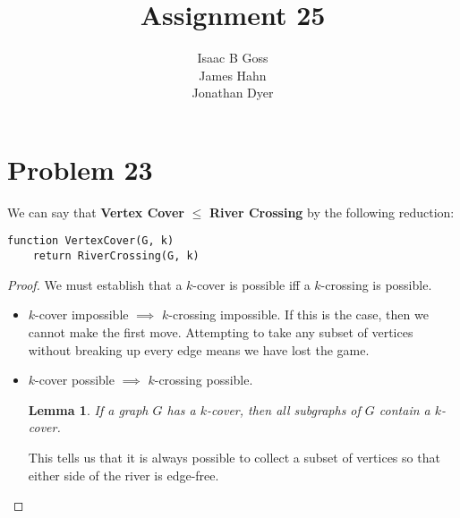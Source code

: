 \documentclass{article}
\author{Isaac B Goss\\ James Hahn\\ Jonathan Dyer}
\title{Assignment 25}
\newtheorem{lemma}{Lemma}
\providecommand{\prob}[1]{\section*{Problem #1}}
\providecommand{\reducible}[2]{
  \textbf{#1} $\leq$ \textbf{#2}
}
\begin{document}
\maketitle

    \prob{23}
    We can say that \reducible{Vertex Cover}{River Crossing} by the following reduction:
    \begin{lstlisting}
function VertexCover(G, k)
    return RiverCrossing(G, k)
    \end{lstlisting}
    \begin{proof}
        We must establish that a $k$-cover is possible iff a $k$-crossing is possible.

        \begin{itemize}
            \item $k$-cover impossible $\implies$ $k$-crossing impossible.
            If this is the case, then we cannot make the first move.
            Attempting to take any subset of vertices without breaking up every edge means we have lost the game.

            \item $k$-cover possible $\implies$ $k$-crossing possible.
            \begin{lemma}
                If a graph $G$ has a $k$-cover, then all subgraphs of $G$ contain a $k$-cover.
            \end{lemma}

            This tells us that it is always possible to collect a subset of vertices so that either side of the river is edge-free.

        \end{itemize}
    \end{proof}
\end{document}
